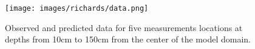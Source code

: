 \begin{figure}[ht]
\begin{center}
\texttt{[image: images/richards/data.png]}
\end{center}
\caption{Observed and predicted data for five measurements locations at depths from 10cm to 150cm from the center of the model domain.}
\label{fig:richards-data}
\end{figure}
